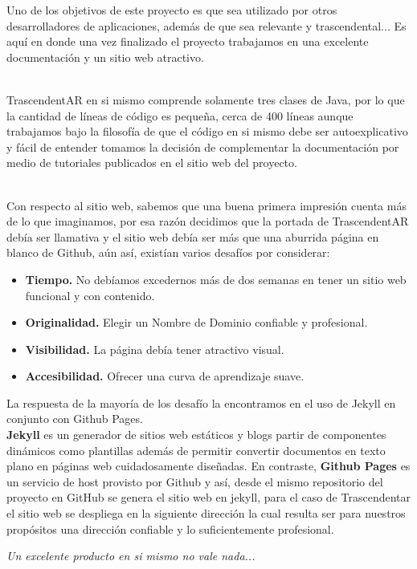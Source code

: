 \begin{multicols}{2}

Uno de los objetivos de este proyecto es que sea utilizado por otros desarrolladores de aplicaciones, además de que sea relevante y trascendental... Es aquí en donde una vez finalizado el proyecto trabajamos en una excelente documentación y un sitio web atractivo. 


\\
TrascendentAR en si mismo comprende solamente tres clases de Java, por lo que la cantidad de líneas de código es pequeña, cerca de 400 líneas aunque trabajamos bajo la filosofía de que el código en si mismo debe ser autoexplicativo y fácil de entender tomamos la decisión de complementar la documentación por medio de tutoriales publicados en el sitio web del proyecto.


\\
Con respecto al sitio web, sabemos que una buena primera impresión cuenta más de lo que imaginamos, por esa razón decidimos que la portada de TrascendentAR debía ser llamativa y el sitio web debía ser más que una aburrida página en blanco de Github, aún así, existían varios desafíos por considerar:

\begin{itemize}
    \item \textbf {Tiempo.} No debíamos excedernos más de dos semanas en tener un sitio web funcional y con contenido.
    \item \textbf {Originalidad.} Elegir un Nombre de Dominio confiable y profesional.
    \item \textbf {Visibilidad.} La página debía tener atractivo visual.
    \item \textbf {Accesibilidad.} Ofrecer una curva de aprendizaje suave.
    
\end{itemize}

La respuesta de la mayoría de los desafío la encontramos en el uso de Jekyll en conjunto con Github Pages.
\\

\textbf {Jekyll} es un generador de sitios web estáticos y blogs partir de componentes dinámicos como plantillas además de permitir convertir documentos en texto plano en páginas web cuidadosamente diseñadas. En contraste, \textbf {Github Pages} es un servicio de host provisto por Github y así, desde el mismo repositorio del proyecto en GitHub se genera el sitio web en jekyll, para el caso de Trascendentar el sitio web se despliega en la siguiente dirección  {\color{introcolor}{glud.github.io/trascendentAR}} la cual resulta ser para nuestros propósitos una dirección confiable y lo suficientemente profesional.
\\ 
\begin{entradilla}
{\em Un excelente producto en si mismo no vale nada... {\color{introcolor}{si nadie lo conoce}} }
\end{entradilla}
\\


\end{multicols}
